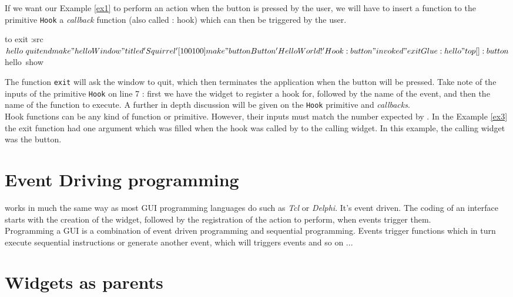 \clearpage


If we want our Example \ref{ex1} to perform an action when the button is pressed by the user, we will have to insert a function to the primitive {\tt Hook} a {\em callback} function (also called : hook) which can then be triggered by the user.

\begin{listing}{1}
to exit :src
	$hello~quit
end

make "hello Window "titled 'Squirrel' [100 100]
make "button Button 'Hello World !'
Hook :button "invoked "exit
Glue :hello "top [] :button 
$hello~show
\end{listing}

The function {\tt exit} will ask the window to quit, which then terminates the application when the button will be pressed. Take note of the inputs of the primitive {\tt Hook} on line 7 : first we have the widget to register a hook for, followed by the name of the event, and then the name of the function to execute. A further in depth discussion will be given on the {\tt Hook} primitive and {\em callbacks}.\\

Hook functions can be any kind of function or primitive. However, their inputs must match the number expected by \squirrel. In the Example \ref{ex3} the exit function had one argument which was filled when the hook was called by \squirrel to the calling widget.  In this example, the calling widget was the button.

\section{Event Driving programming}

\squirrel works in much the same way as most GUI programming languages do such as {\em Tcl} or {\em Delphi}. It's event driven. The coding of an interface starts with the creation of the widget, followed by the registration of the action to perform, when events trigger them.\\

Programming a GUI is a combination of event driven programming and sequential programming. Events trigger functions which in turn execute sequential instructions or generate another event, which will triggers events and so on ...

\section{Widgets as parents}

